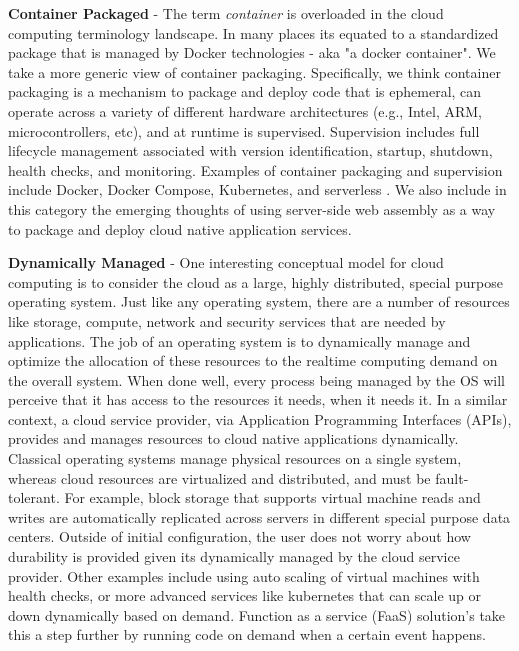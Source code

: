 \documentclass[conference]{IEEEtran}
\begin{document}
\textbf{Container Packaged} - The term \textit{container} is overloaded in the cloud computing terminology landscape.  In many places its equated to a standardized package that is managed by Docker\cite{DockerContainer} technologies - aka "a docker container".  We take a more generic view of container packaging. Specifically, we think container packaging is a mechanism to package and deploy code that is ephemeral, can operate across a variety of different hardware architectures (e.g., Intel, ARM, microcontrollers, etc), and at runtime is supervised.  Supervision includes full lifecycle management associated with version identification, startup, shutdown, health checks, and monitoring.  Examples of container packaging and supervision include Docker, Docker Compose, Kubernetes, and serverless \cite{baldini2017serverless}. We also include in this category the emerging thoughts of using server-side web assembly\cite{haas2017bringing, bosshard2020use} as a way to package and deploy cloud native application services. 

\textbf{Dynamically Managed} - One interesting conceptual model for cloud computing is to consider the cloud as a large, highly distributed, special purpose operating system. Just like any operating system, there are a number of resources like storage, compute, network and security services that are needed by applications.  The job of an operating system is to dynamically manage and optimize the allocation of these resources to the realtime computing demand on the overall system.  When done well, every process being managed by the OS will perceive that it has access to the resources it needs, when it needs it.  In a similar context, a cloud service provider, via Application Programming Interfaces (APIs), provides and manages resources to cloud native applications dynamically. Classical operating systems manage physical resources on a single system, whereas cloud resources are virtualized and distributed, and must be fault-tolerant.  For example, block storage that supports virtual machine reads and writes are automatically replicated across servers in different special purpose data centers. Outside of initial configuration, the user does not worry about how durability is provided given its dynamically managed by the cloud service provider. Other examples include using auto scaling of virtual machines with health checks, or more advanced services like kubernetes\cite{kubernetes} that can scale up or down dynamically based on demand. Function as a service (FaaS) solution's take this a step further by running code on demand when a certain event happens.     
\end{document}
